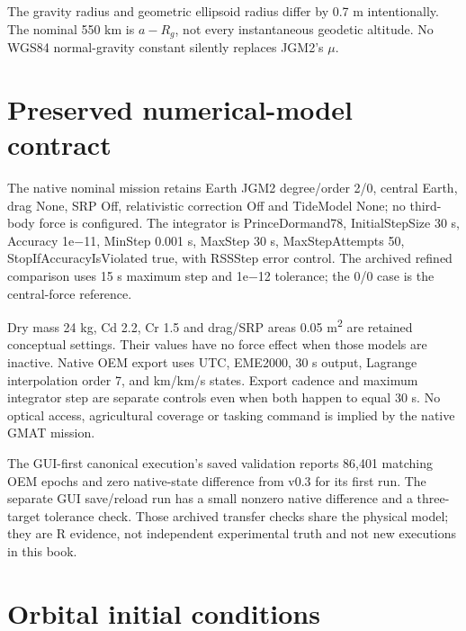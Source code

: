 \documentclass[10pt,a4paper]{article}
\numberwithin{equation}{section}
\begin{document}
\begin{sloppypar}The gravity radius and geometric ellipsoid radius differ by 0.7 m intentionally. The nominal 550 km is \(a-R_g\), not every instantaneous geodetic altitude. No WGS84 normal-gravity constant silently replaces JGM2's \(\mu\).\end{sloppypar}


\section*{Preserved numerical-model contract}

\begin{sloppypar}The native nominal mission retains Earth JGM2 degree/order 2/0, central Earth, drag None, SRP Off, relativistic correction Off and TideModel None; no third-body force is configured. The integrator is PrinceDormand78, InitialStepSize 30 s, Accuracy 1e\ensuremath{-}11, MinStep 0.001 s, MaxStep 30 s, MaxStepAttempts 50, StopIfAccuracyIsViolated true, with RSSStep error control. The archived refined comparison uses 15 s maximum step and 1e\ensuremath{-}12 tolerance; the 0/0 case is the central-force reference.\end{sloppypar}


\begin{sloppypar}Dry mass 24 kg, Cd 2.2, Cr 1.5 and drag/SRP areas 0.05 m\textsuperscript{2} are retained conceptual settings. Their values have no force effect when those models are inactive. Native OEM export uses UTC, EME2000, 30 s output, Lagrange interpolation order 7, and km/km/s states. Export cadence and maximum integrator step are separate controls even when both happen to equal 30 s. No optical access, agricultural coverage or tasking command is implied by the native GMAT mission.\end{sloppypar}


\begin{sloppypar}The GUI-first canonical execution's saved validation reports 86,401 matching OEM epochs and zero native-state difference from v0.3 for its first run. The separate GUI save/reload run has a small nonzero native difference and a three-target tolerance check. Those archived transfer checks share the physical model; they are R evidence, not independent experimental truth and not new executions in this book.\end{sloppypar}


\clearpage\section{Orbital initial conditions}\label{ch:1}
\end{document}
